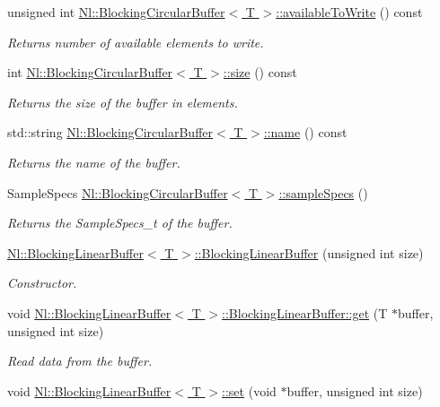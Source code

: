 \begin{DoxyCompactItemize}
unsigned int \hyperlink{group__Audio_ga440f66059781b20486d6d6c160e4f0ed}{Nl\-::\-Blocking\-Circular\-Buffer$<$ T $>$\-::available\-To\-Write} () const 
\begin{DoxyCompactList}\small\item\em Returns number of available elements to write. \end{DoxyCompactList}\item 
int \hyperlink{group__Audio_ga8e5076598374af82eb754cea0c88d12d}{Nl\-::\-Blocking\-Circular\-Buffer$<$ T $>$\-::size} () const 
\begin{DoxyCompactList}\small\item\em Returns the size of the buffer in elements. \end{DoxyCompactList}\item 
std\-::string \hyperlink{group__Audio_gad287c03d36b07643b960d531b5553109}{Nl\-::\-Blocking\-Circular\-Buffer$<$ T $>$\-::name} () const 
\begin{DoxyCompactList}\small\item\em Returns the name of the buffer. \end{DoxyCompactList}\item 
Sample\-Specs \hyperlink{group__Audio_ga679616fc01beaa6db6774a5cdabc5cd9}{Nl\-::\-Blocking\-Circular\-Buffer$<$ T $>$\-::sample\-Specs} ()
\begin{DoxyCompactList}\small\item\em Returns the Sample\-Specs\-\_\-t of the buffer. \end{DoxyCompactList}\item 
\hyperlink{group__Audio_gae6f35f45439b194a69587bd9c124a736}{Nl\-::\-Blocking\-Linear\-Buffer$<$ T $>$\-::\-Blocking\-Linear\-Buffer} (unsigned int size)
\begin{DoxyCompactList}\small\item\em Constructor. \end{DoxyCompactList}\item 
void \hyperlink{group__Audio_ga7fd45f57444309f03fab9a13644d2240}{Nl\-::\-Blocking\-Linear\-Buffer$<$ T $>$\-::\-Blocking\-Linear\-Buffer\-::get} (T $\ast$buffer, unsigned int size)
\begin{DoxyCompactList}\small\item\em Read data from the buffer. \end{DoxyCompactList}\item 
void \hyperlink{group__Audio_gacd7c49cb333fc991edae3247d2fb34ef}{Nl\-::\-Blocking\-Linear\-Buffer$<$ T $>$\-::set} (void $\ast$buffer, unsigned int size)

\end{DoxyCompactItemize}
